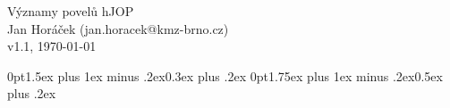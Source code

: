 \documentclass[12pt,a4paper,landscape]{article}
\begin{document}
\pagestyle{empty}

\begin{center}
\huge Významy povelů hJOP\\
\normalsize Jan Horáček (jan.horacek@kmz-brno.cz)\\
v1.1, \today
\end{center}

\titlespacing*{\section} {0pt}{1.5ex plus 1ex minus .2ex}{0.3ex plus .2ex}
\titlespacing*{\subsection} {0pt}{1.75ex plus 1ex minus .2ex}{0.5ex plus .2ex}


\end{document}

